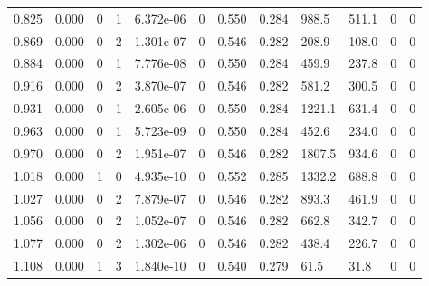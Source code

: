 \documentclass[preview]{standalone}
\begin{document}
{{\begin{tabular}{L{1.2cm}C{1.2cm} C{0.3cm}C{0.5cm} C{1.4cm}C{1.4cm} C{1.4cm}C{1.4cm} C{1.6cm}C{1.6cm} C{1.6cm}C{1.6cm}}
  0.825  &  0.000  & 0     &  1 &  6.372e-06  & 0  &  0.550&   0.284& 988.5 & 511.1   &  0 & 0  \\ 
  0.869  &  0.000  & 0     &  2 &  1.301e-07  & 0  &  0.546&   0.282& 208.9 & 108.0   &  0 & 0  \\ 
  0.884  &  0.000  & 0     &  1 &  7.776e-08  & 0  &  0.550&   0.284& 459.9 & 237.8   &  0 & 0  \\ 
  0.916  &  0.000  & 0     &  2 &  3.870e-07  & 0  &  0.546&   0.282& 581.2 & 300.5   &  0 & 0  \\ 
  0.931  &  0.000  & 0     &  1 &  2.605e-06  & 0  &  0.550&   0.284& 1221.1 & 631.4   &  0 & 0  \\ 
  0.963  &  0.000  & 0     &  1 &  5.723e-09  & 0  &  0.550&   0.284& 452.6 & 234.0   &  0 & 0  \\ 
  0.970  &  0.000  & 0     &  2 &  1.951e-07  & 0  &  0.546&   0.282& 1807.5 & 934.6   &  0 & 0  \\ 
  1.018  &  0.000  & 1     &  0 &  4.935e-10  & 0  &  0.552&   0.285& 1332.2 & 688.8   &  0 & 0  \\ 
  1.027  &  0.000  & 0     &  2 &  7.879e-07  & 0  &  0.546&   0.282& 893.3 & 461.9   &  0 & 0  \\ 
  1.056  &  0.000  & 0     &  2 &  1.052e-07  & 0  &  0.546&   0.282& 662.8 & 342.7   &  0 & 0  \\ 
  1.077  &  0.000  & 0     &  2 &  1.302e-06  & 0  &  0.546&   0.282& 438.4 & 226.7   &  0 & 0  \\ 
  1.108  &  0.000  & 1     &  3 &  1.840e-10  & 0  &  0.540&   0.279& 61.5 & 31.8   &  0 & 0  \\ 
\hline 
\end{tabular} 

}}
\end{document}

